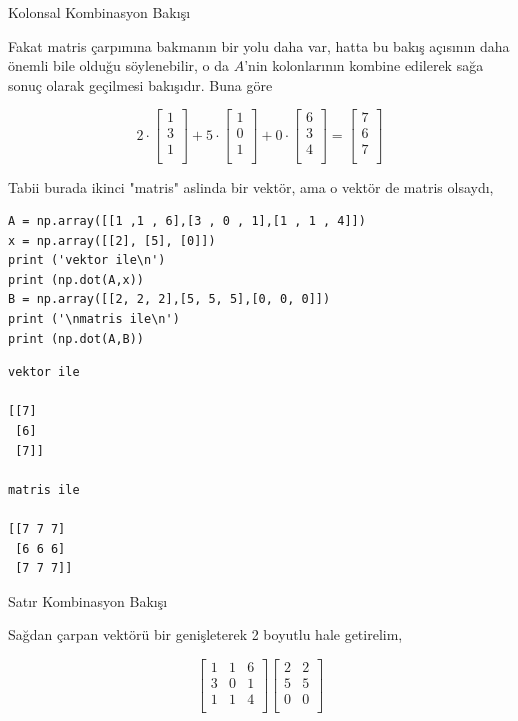 \documentclass[12pt,fleqn]{article}\usepackage{../../common}
\begin{document}
Kolonsal Kombinasyon Bakışı

Fakat matris çarpımına bakmanın bir yolu daha var, hatta bu bakış açısının daha
önemli bile olduğu söylenebilir, o da $A$'nin kolonlarının kombine edilerek
sağa sonuç olarak geçilmesi bakışıdır. Buna göre

$$ 
2\cdot 
\left[\begin{array}{ccc}
1 \\
3 \\
1 \\
\end{array}\right]
+
5\cdot 
\left[\begin{array}{c}
1 \\
0 \\
1 \\
\end{array}\right]
+
0\cdot 
\left[\begin{array}{c}
6 \\
3 \\
4 \\
\end{array}\right]
=
\left[\begin{array}{c}
7 \\
6 \\
7 \\
\end{array}\right]
$$

Tabii burada ikinci "matris" aslinda bir vektör, ama o vektör de matris
olsaydı,

\begin{verbatim}
A = np.array([[1 ,1 , 6],[3 , 0 , 1],[1 , 1 , 4]])
x = np.array([[2], [5], [0]])
print ('vektor ile\n')
print (np.dot(A,x))
B = np.array([[2, 2, 2],[5, 5, 5],[0, 0, 0]])
print ('\nmatris ile\n')
print (np.dot(A,B))
\end{verbatim}

\begin{verbatim}
vektor ile

[[7]
 [6]
 [7]]

matris ile

[[7 7 7]
 [6 6 6]
 [7 7 7]]
\end{verbatim}

Satır Kombinasyon Bakışı

Sağdan çarpan vektörü bir genişleterek 2 boyutlu hale getirelim, 

$$
\left[\begin{array}{ccc}
1 & 1 & 6 \\
3 & 0 & 1 \\
1 & 1 & 4 \\
\end{array}\right]
\left[\begin{array}{ccc}
2 & 2  \\
5 & 5  \\
0 & 0  \\
\end{array}\right]
$$
\end{document}
